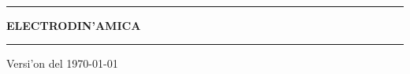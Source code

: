 \documentclass[letterpaper,11pt]{report}
\begin{document}
\sffamily

\thispagestyle{empty}
\begin{center}

\

\rule{14cm}{0.1cm}

\vspace{1.5cm}

{\huge \textsc{\textbf{ELECTRODIN'AMICA}}}

\vspace{1.5cm}

\rule{14cm}{0.1cm}

\vspace{1.0cm}

Versi'on del \today

\end{center}

\tableofcontents
{}
\setcounter{page}{1}


\newpage

\newpage

\newpage

\newpage

\newpage

\newpage
\appendix

\newpage

\newpage

\end{document}
